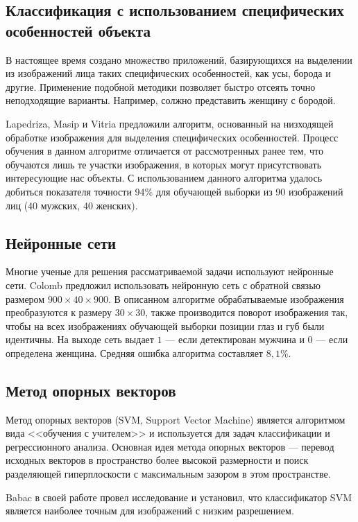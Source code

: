 \subsection{Классификация с использованием специфических особенностей объекта}

В настоящее время создано множество приложений, базирующихся на выделении из
изображений лица таких специфических особенностей, как усы, борода и другие.
Применение подобной методики позволяет быстро отсеять точно неподходящие
варианты. Например, солжно представить женщину с бородой.

Lapedriza, Masip и Vitria \cite{Lapedriza_Masip_Vitria} предложили алгоритм,
основанный на низходящей обработке изображения для выделения специфических
особенностей. Процесс обучения в данном алгоритме отличается от рассмотренных
ранее тем, что обучаются лишь те участки изображения, в которых могут
присутствовать интересующие нас объекты. С использованием данного алгоритма
удалось добиться показателя точности 94\% для обучающей выборки из 90
изображений лиц (40 мужских, 40 женских).


\subsection{Нейронные сети}
Многие ученые для решения рассматриваемой задачи используют нейронные сети.
Colomb \cite{Colomb} предложил использовать нейронную сеть с обратной связью
размером $900\times40\times900$. В описанном алгоритме обрабатываемые
изображения преобразуются к размеру $30\times30$, также производится поворот
изображения так, чтобы на всех изображениях обучающей выборки позиции глаз и губ
были идентичны. На выходе сеть выдает $1$ --- если детектирован мужчина и $0$
--- если определена женщина. Средняя ошибка алгоритма \cite{Colomb} составляет
$8,1\%$.  

\subsection{Метод опорных векторов}
Метод опорных векторов (SVM, Support Vector Machine) является алгоритмом вида
<<обучения с учителем>> и используется для задач классификации и регрессионного
анализа. Основная идея метода опорных векторов --- перевод исходных векторов в
пространство более высокой размерности и поиск разделяющей гиперплоскости с
максимальным зазором в этом пространстве. 

Babac в своей работе \cite{Babac} провел исследование и установил, что
классификатор SVM является наиболее точным для изображений с низким
разрешением.


